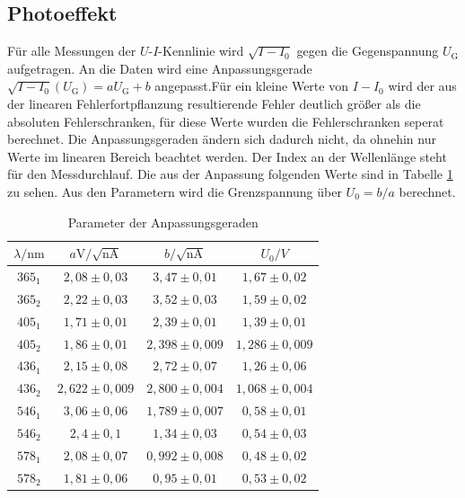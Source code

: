 \subsection{Photoeffekt}
Für alle Messungen der $U$-$I$-Kennlinie wird $\sqrt{I-I_0}$ gegen die Gegenspannung $U_\mathrm{G}$ aufgetragen. An die Daten wird eine Anpassungsgerade $\sqrt{I-I_0}(U_\mathrm{G})=aU_\mathrm{G}+b$ angepasst.Für ein kleine Werte von $I-I_0$ wird der aus der linearen Fehlerfortpflanzung resultierende Fehler deutlich größer als die absoluten Fehlerschranken, für diese Werte wurden die Fehlerschranken seperat berechnet. Die Anpassungsgeraden ändern sich dadurch nicht, da ohnehin nur Werte im linearen Bereich beachtet werden. Der Index an der Wellenlänge steht für den Messdurchlauf. Die aus der Anpassung folgenden Werte sind in Tabelle \ref{tab:photoeffekt} zu sehen. Aus den Parametern wird die Grenzspannung über $U_0=b/a$ berechnet.

\begin{table}[h]
  \centering
    \begin{tabular}{c c c c}
      \toprule
      $\lambda/\mathrm{nm}$ & $a\mathrm{V}/ \sqrt{\mathrm{nA}}$ & $b/\sqrt{\mathrm{nA}}$ & $U_0/V$\\
      \midrule
      $365_1$ & $2,08 \pm 0,03 $ &$3,47 \pm 0,01 $ & $1,67 \pm 0,02$\\
      $365_2$ & $2,22 \pm 0,03 $ &$3,52 \pm 0,03  $ & $1,59 \pm 0,02$\\
      $405_1$ & $1,71 \pm 0,01 $ &$2,39 \pm 0,01 $ & $1,39 \pm 0,01$\\
      $405_2$ & $1,86 \pm 0,01 $ &$2,398 \pm 0,009$ & $1,286 \pm 0,009$\\
      $436_1$ & $2,15 \pm 0,08 $ &$2,72 \pm 0,07  $ & $1,26 \pm 0,06  $\\
      $436_2$ & $2,622 \pm 0,009$ &$2,800 \pm 0,004$ & $1,068 \pm 0,004 $\\
      $546_1$ & $3,06 \pm 0,06 $ &$1,789 \pm 0,007$ & $0,58 \pm 0,01$\\
      $546_2$ & $2,4 \pm 0,1  $ &$1,34 \pm 0,03  $ & $0,54 \pm 0,03$\\
      $578_1$ & $2,08 \pm 0,07 $ &$0,992 \pm 0,008$ & $0,48 \pm 0,02$\\
      $578_2$ & $1,81 \pm 0,06 $ &$0,95 \pm 0,01$ & $0,53 \pm 0,02$\\
      \bottomrule
    \end{tabular}
    \caption{Parameter der Anpassungsgeraden}
    \label{tab:photoeffekt}
\end{table}


